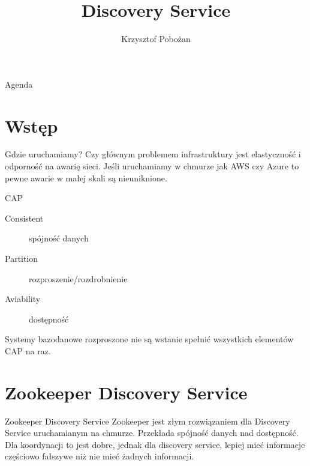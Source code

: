 \documentclass[epic,eepic,aspectratio=169,12pt]{beamer}
\title{Discovery Service}
\author{Krzysztof Pobożan}
\begin{document}
	\begin{frame}
		\maketitle
	\end{frame}
	\begin{frame}{Agenda}
		\tableofcontents
	\end{frame}
	\section{Wstęp}
	\begin{frame}{Gdzie uruchamiamy?}
		Czy głównym problemem infrastruktury jest elastyczność i odporność na awarię sieci.
		Jeśli uruchamiamy w chmurze jak AWS czy Azure to pewne awarie w małej skali są nieuniknione.
	\end{frame}
	\begin{frame}{CAP}
		\begin{description}
			\item[Consistent] spójność danych
			\item[Partition] rozproszenie/rozdrobnienie
			\item[Aviability] dostępność
		\end{description}
		Systemy bazodanowe rozproszone nie są wstanie spełnić wszystkich elementów CAP na raz.
	\end{frame}
	\section{Zookeeper Discovery Service}
	\begin{frame}{Zookeeper Discovery Service}
		Zookeeper jest złym rozwiązaniem dla Discovery Service uruchamianym na chmurze.
		Przekłada spójność danych nad dostępność.
		Dla koordynacji to jest dobre, jednak dla discovery service, lepiej mieć informacje częściowo fałszywe niż nie mieć żadnych informacji.
		
	\end{frame}
\end{document}

